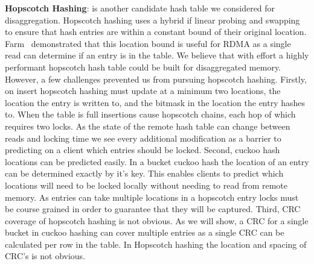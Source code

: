 \textbf{Hopscotch Hashing}: is another candidate hash table
we considered for disaggregation. Hopscotch hashing uses a
hybrid if linear probing and swapping to ensure that hash
entries are within a constant bound of their original
location. Farm~\cite{farm} demonstrated that this location
bound is useful for RDMA as a single read can determine if
an entry is in the table. We believe that with effort a
highly performant hopscotch hash table could be built for
disaggregated memory. However, a few challenges prevented us
from pursuing hopscotch hashing. 
Firstly, on insert hopscotch hashing must update at a
minimum two locations, the location the entry is written to,
and the bitmask in the location the entry hashes to. When
the table is full insertions cause hopscotch chains, each
hop of which requires two locks. As the state of the remote
hash table can change between reads and locking time we see
every additional modification as a barrier to predicting on
a client which entries should be locked.
Second, cuckoo hash locations can be predicted easily. In a
bucket cuckoo hash the location of an entry can be
determined exactly by it's key. This enables clients to
predict which locations will need to be locked locally
without needing to read from remote memory. As entries can
take multiple locations in a hopscotch entry locks must be
course grained in order to guarantee that they will be
captured.
Third, CRC coverage of hopscotch hashing is not obvious. As
we will show, a CRC for a single bucket in cuckoo hashing
can cover multiple entries as a single CRC can be calculated
per row in the table. In Hopscotch hashing the location and
spacing of CRC's is not obvious.


